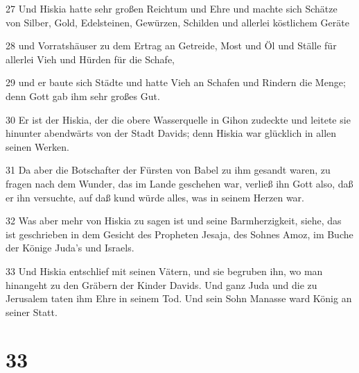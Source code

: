\par 27 Und Hiskia hatte sehr großen Reichtum und Ehre und machte sich Schätze von Silber, Gold, Edelsteinen, Gewürzen, Schilden und allerlei köstlichem Geräte
\par 28 und Vorratshäuser zu dem Ertrag an Getreide, Most und Öl und Ställe für allerlei Vieh und Hürden für die Schafe,
\par 29 und er baute sich Städte und hatte Vieh an Schafen und Rindern die Menge; denn Gott gab ihm sehr großes Gut.
\par 30 Er ist der Hiskia, der die obere Wasserquelle in Gihon zudeckte und leitete sie hinunter abendwärts von der Stadt Davids; denn Hiskia war glücklich in allen seinen Werken.
\par 31 Da aber die Botschafter der Fürsten von Babel zu ihm gesandt waren, zu fragen nach dem Wunder, das im Lande geschehen war, verließ ihn Gott also, daß er ihn versuchte, auf daß kund würde alles, was in seinem Herzen war.
\par 32 Was aber mehr von Hiskia zu sagen ist und seine Barmherzigkeit, siehe, das ist geschrieben in dem Gesicht des Propheten Jesaja, des Sohnes Amoz, im Buche der Könige Juda's und Israels.
\par 33 Und Hiskia entschlief mit seinen Vätern, und sie begruben ihn, wo man hinangeht zu den Gräbern der Kinder Davids. Und ganz Juda und die zu Jerusalem taten ihm Ehre in seinem Tod. Und sein Sohn Manasse ward König an seiner Statt.

\chapter{33}

